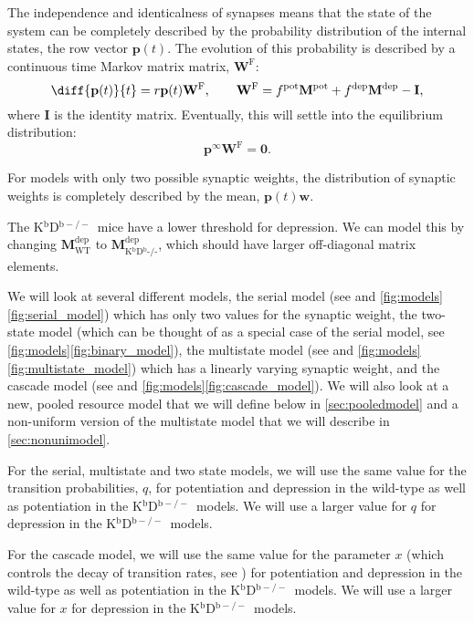 \documentclass[10pt]{article}
\newcommand{\I}{\mathbf{I}}
\newcommand{\pr}{\mathbf{p}}
\newcommand{\eq}{\pr^\infty}
\newcommand{\w}{\mathbf{w}}
\newcommand{\W}{\mathbf{W}}
\newcommand{\frg}{\W^\mathrm{F}}
\newcommand{\M}{\mathbf{M}}
\newcommand{\pot}{^{\text{pot}}}
\newcommand{\dep}{^{\text{dep}}}
\newcommand{\wt}{_{\text{WT}}}
\newcommand{\ko}{_{\text{K$^\mathrm{b}$D$^\mathrm{b}$-/-}}}
\newcommand{\KO}{K$^\mathrm{b}$D$^{\mathrm{b}-/-}$}
\begin{document}
The independence and identicalness of synapses means that the state of the system can be completely described by the probability distribution of the internal states, the row vector $\pr(t)$.
The evolution of this probability is described by a continuous time Markov matrix matrix, $\frg$:
%
\begin{equation}\label{eq:evolve}
  \diff{\pr(t)}{t} = r\pr(t)\frg,
  \qquad
  \frg = f\pot\M\pot+f\dep\M\dep-\I,
\end{equation}
%
where $\I$ is the identity matrix.
Eventually, this will settle into the equilibrium distribution:
%
\begin{equation}\label{eq:eqprob}
  \eq\frg = \mathbf{0}.
\end{equation}
%

For models with only two possible synaptic weights, the distribution of synaptic weights is completely described by the mean, $\pr(t)\w$.


The \KO\ mice have a lower threshold for depression.
We can model this by changing $\M\dep\wt$ to $\M\dep\ko$, which should have larger off-diagonal matrix elements.

We will look at several different models,
the serial model (see \cite{Leibold2008serial} and \autoref{fig:models}\ref{fig:serial_model}) which has only two values for the synaptic weight,
the two-state model (which can be thought of as a special case of the serial model, see \autoref{fig:models}\ref{fig:binary_model}),
the multistate model (see \cite{amit1994learning,Fusi2007multistate} and \autoref{fig:models}\ref{fig:multistate_model}) which has a linearly varying synaptic weight,
and the cascade model (see \cite{Fusi2005cascade} and \autoref{fig:models}\ref{fig:cascade_model}).
We will also look at a new, pooled resource model that we will define below in \autoref{sec:pooledmodel} and a non-uniform version of the multistate model that we will describe in \autoref{sec:nonunimodel}.

For the serial, multistate and two state models, we will use the same value for the transition probabilities, $q$, for potentiation and depression in the wild-type as well as potentiation in the \KO\ models.
We will use a larger value for $q$ for depression in the \KO\ models.

For the cascade model, we will use the same value for the parameter $x$ (which controls the decay of transition rates, see \cite{Fusi2005cascade}) for potentiation and depression in the wild-type as well as potentiation in the \KO\ models.
We will use a larger value for $x$ for depression in the \KO\ models.
\end{document}
